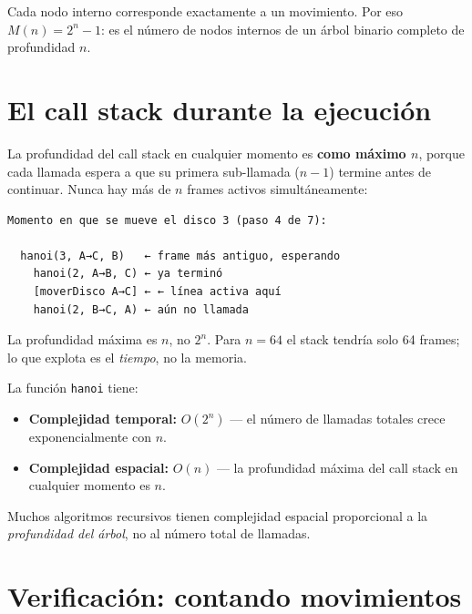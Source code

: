 \documentclass[12pt, oneside]{article}
\begin{document}
Cada nodo interno corresponde exactamente a un movimiento.
Por eso $M(n) = 2^n - 1$: es el número de nodos internos de un árbol
binario completo de profundidad $n$.

\section{El call stack durante la ejecución}

La profundidad del call stack en cualquier momento es \textbf{como máximo $n$},
porque cada llamada espera a que su primera sub-llamada ($n-1$) termine antes
de continuar.  Nunca hay más de $n$ frames activos simultáneamente:

\begin{verbatim}
Momento en que se mueve el disco 3 (paso 4 de 7):

  hanoi(3, A→C, B)   ← frame más antiguo, esperando
    hanoi(2, A→B, C) ← ya terminó
    [moverDisco A→C] ← ← línea activa aquí
    hanoi(2, B→C, A) ← aún no llamada
\end{verbatim}

La profundidad máxima es $n$, no $2^n$.
Para $n = 64$ el stack tendría solo 64 frames; lo que explota es el
\textit{tiempo}, no la memoria.

\begin{tecnico}
  La función \texttt{hanoi} tiene:
  \begin{itemize}
    \item \textbf{Complejidad temporal:} $O(2^n)$ — el número de llamadas totales
          crece exponencialmente con $n$.
    \item \textbf{Complejidad espacial:} $O(n)$ — la profundidad máxima del
          call stack en cualquier momento es $n$.
  \end{itemize}
  Muchos algoritmos recursivos tienen complejidad espacial proporcional a la
  \textit{profundidad del árbol}, no al número total de llamadas.
\end{tecnico}

\section{Verificación: contando movimientos}
\end{document}
